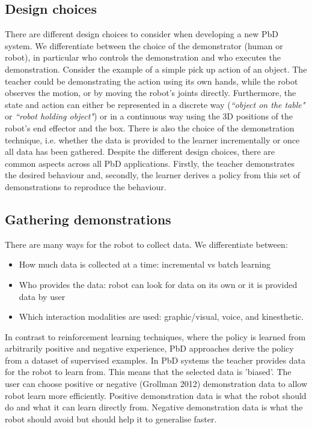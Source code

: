 \subsection{Design choices}
There are different design choices to consider when developing a new PbD system.
We differentiate between the choice of the demonstrator (human or robot), in particular who controls the demonstration and who executes the demonstration. Consider the example of a simple pick up action of an object. The teacher could be demonstrating the action using its own hands, while the robot observes the motion, or by moving the robot's joints directly. Furthermore, the state and action can either be represented in a discrete way (\textit{``object on the table"} or \textit{``robot holding object"}) or in a continuous way using the 3D positions of the robot's end effector and the box. There is also the choice of the demonstration technique, i.e. whether the data is provided to the learner incrementally or once all data has been gathered. 
Despite the different design choices, there are common aspects across all PbD applications. Firstly, the teacher demonstrates the desired behaviour and, secondly, the learner derives a policy from this set of demonstrations to reproduce the behaviour.

\subsection{Gathering demonstrations} \label{subsec:Gathering demonstrations}
There are many ways for the robot to collect data. We differentiate between:
\begin{itemize}
    \item How much data is collected at a time: incremental vs batch learning
    \item Who provides the data: robot can look for data on its own or it is provided data by user
    \item Which interaction modalities are used: graphic/visual, voice, and kinesthetic. 
\end{itemize}

In contrast to reinforcement learning techniques, where the policy is learned from arbitrarily positive and negative experience, PbD approaches derive the policy from a dataset of supervised examples. In PbD systems the teacher provides data for the robot to learn from. This means that the selected data is 'biased'. The user can choose positive or negative (Grollman 2012) demonstration data to allow robot learn more efficiently. Positive demonstration data is what the robot should do and what it can learn directly from. Negative demonstration data is what the robot should avoid but should help it to generalise faster.

